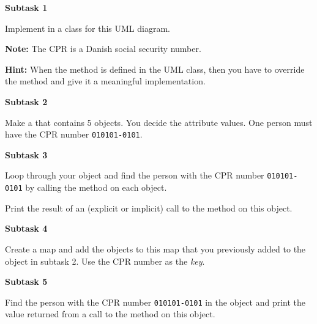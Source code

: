 \textbf{Subtask 1}

Implement in \csharp a class for this UML diagram.

\begin{center}
\end{center}

\textbf{Note:} The CPR is a Danish social security number.

\textbf{Hint:} When the  method is defined in the UML class, then you have to override the method and give it a meaningful implementation.

\textbf{Subtask 2}

Make a  that contains 5  objects. You decide the attribute values. One person must have the CPR number \texttt{010101-0101}.

\textbf{Subtask 3}

Loop through your  object and find the person with the CPR number \texttt{010101-0101} by calling the method  on each object.

Print the result of an (explicit or implicit) call to the  method on this object.

\textbf{Subtask 4}

Create a  map and add the  objects to this map that you previously added to the  object in subtask 2. Use the CPR number as the \textsl{key}.

\textbf{Subtask 5}

Find the person with the CPR number \texttt{010101-0101} in the  object and print the value returned from a call to the  method on this object.
